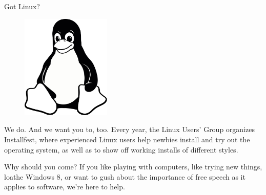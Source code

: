 \documentclass[10pt]{article}
\begin{document}
\pagestyle{empty}

\begin{center} \LARGE \textsc
    Got Linux?
\end{center}

\begin{figure}
    \vspace{-2em} %
    \begin{center}
        \includegraphics[width=0.38\textwidth]{tux-bw}
    \end{center}
\end{figure}

{\small

We do. And we want you to, too. Every year, the Linux Users' Group organizes
Installfest, where experienced Linux users help newbies install and try out the
operating system, as well as to show off working installs of different styles.

Why should you come? If you like playing with computers, like trying new things,
loathe Windows 8, or want to gush about the importance of free speech as it
applies to software, we're here to help.

}
\end{document}

